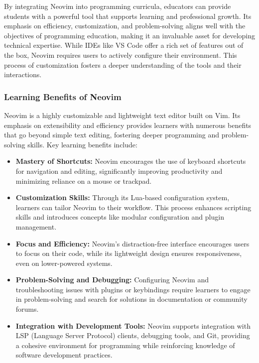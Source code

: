 \documentclass[12pt]{article}
\begin{document}
By integrating Neovim into programming curricula, educators can provide students with a powerful tool that supports learning and professional growth. Its emphasis on efficiency, customization, and problem-solving aligns well with the objectives of programming education, making it an invaluable asset for developing technical expertise. While IDEs like VS Code offer a rich set of features out of the box, Neovim requires users to actively configure their environment. This process of customization fosters a deeper understanding of the tools and their interactions.


\subsubsection{Learning Benefits of Neovim}
Neovim is a highly customizable and lightweight text editor built on Vim. Its emphasis on extensibility and efficiency provides learners with numerous benefits that go beyond simple text editing, fostering deeper programming and problem-solving skills. Key learning benefits include:  

\begin{itemize}
    \item \textbf{Mastery of Shortcuts:} Neovim encourages the use of keyboard shortcuts for navigation and editing, significantly improving productivity and minimizing reliance on a mouse or trackpad.  
    \item \textbf{Customization Skills:} Through its Lua-based configuration system, learners can tailor Neovim to their workflow. This process enhances scripting skills and introduces concepts like modular configuration and plugin management.  
    \item \textbf{Focus and Efficiency:} Neovim’s distraction-free interface encourages users to focus on their code, while its lightweight design ensures responsiveness, even on lower-powered systems.  
    \item \textbf{Problem-Solving and Debugging:} Configuring Neovim and troubleshooting issues with plugins or keybindings require learners to engage in problem-solving and search for solutions in documentation or community forums.  
    \item \textbf{Integration with Development Tools:} Neovim supports integration with LSP (Language Server Protocol) clients, debugging tools, and Git, providing a cohesive environment for programming while reinforcing knowledge of software development practices.
\end{itemize}
\end{document}

